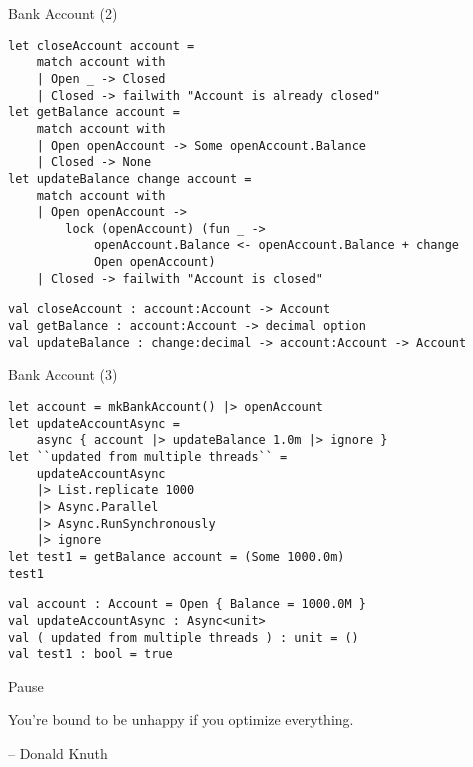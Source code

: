 \documentclass[t]{beamer}
\begin{document}
\begin{frame}[label={sec:org40062e0},fragile]{Bank Account (2)}
 \begin{verbatim}
let closeAccount account =
    match account with
    | Open _ -> Closed
    | Closed -> failwith "Account is already closed"
let getBalance account =
    match account with
    | Open openAccount -> Some openAccount.Balance
    | Closed -> None
let updateBalance change account =
    match account with
    | Open openAccount ->
        lock (openAccount) (fun _ ->
            openAccount.Balance <- openAccount.Balance + change
            Open openAccount)
    | Closed -> failwith "Account is closed"
\end{verbatim}

\begin{verbatim}
val closeAccount : account:Account -> Account
val getBalance : account:Account -> decimal option
val updateBalance : change:decimal -> account:Account -> Account
\end{verbatim}
\end{frame}

\begin{frame}[label={sec:orgfba2a2d},fragile]{Bank Account (3)}
 \begin{verbatim}
let account = mkBankAccount() |> openAccount
let updateAccountAsync =        
    async { account |> updateBalance 1.0m |> ignore }
let ``updated from multiple threads`` =
    updateAccountAsync
    |> List.replicate 1000
    |> Async.Parallel 
    |> Async.RunSynchronously
    |> ignore
let test1 = getBalance account = (Some 1000.0m)
test1
\end{verbatim}

\begin{verbatim}
val account : Account = Open { Balance = 1000.0M }
val updateAccountAsync : Async<unit>
val ( updated from multiple threads ) : unit = ()
val test1 : bool = true
\end{verbatim}
\end{frame}

\begin{frame}[label={sec:org2346c6b}]{Pause}
\begin{block}{}
You’re bound to be unhappy if you optimize everything.

\null\hfill -- Donald Knuth
\end{block}
\end{frame}
\end{document}
